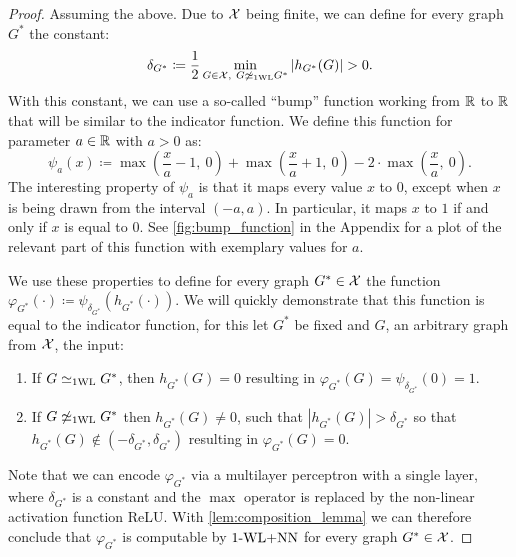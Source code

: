 \begin{proof}
    Assuming the above. Due to $\mathcal{X}$ being finite, we can define for every graph $G^*$ the constant:
    \begin{equation*}
        \delta_{G^*} \coloneqq \frac{1}{2} \min_{G \in \mathcal{X} , \  G \not\simeq_{\text{1WL}} G^*} |h_{G^*}(G)| > 0.
    \end{equation*}
    With this constant, we can use a so-called ``bump'' function working from $\mathbb{R}$ to $\mathbb{R}$ that will be similar to the indicator function. We define this function for parameter $a \in \mathbb{R}$ with $a > 0$ as:
    \begin{equation*}
        \psi_a(x) \coloneqq \max(\frac{x}{a} -1,\ 0) + \max(\frac{x}{a}+1, \ 0) - 2 \cdot \max(\frac{x}{a}, \ 0).
    \end{equation*}
    The interesting property of $\psi_a$ is that it maps every value $x$ to $0$, except when $x$ is being drawn from the interval $(-a, a)$. In particular, it maps $x$ to $1$ if and only if $x$ is equal to $0$. See \autoref{fig:bump_function} in the Appendix for a plot of the relevant part of this function with exemplary values for $a$.
    
    We use these properties to define for every graph ${G^*} \in \mathcal{X}$ the function $\varphi_{G^*}(\cdot) \coloneqq \psi_{\delta_{G^*}} (h_{G^*}(\cdot))$. 
    We will quickly demonstrate that this function is equal to the indicator function, for this let $G^*$ be fixed and $G$, an arbitrary graph from $\mathcal{X}$, the input:
    \begin{enumerate}
        \item If $G \simeq_{\text{1WL}} G^*$, then $h_{G^*}(G) = 0$ resulting in $\varphi_{G^*}(G) = \psi_{\delta_{G^*}}(0) = 1$.
        \item If $G \not\simeq_{\text{1WL}} G^*$ then $h_{G^*}(G) \neq 0$, such that $|h_{G^*}(G)|> \delta_{G^*}$ so that $h_{G^*}(G) \not\in (-\delta_{G^*}, \delta_{G^*}) $ resulting in $\varphi_{G^*}(G) = 0$.
    \end{enumerate}
    Note that we can encode $\varphi_{G^*}$ via a multilayer perceptron with a single layer, where $\delta_{G^*}$ is a constant and the $\max$ operator is replaced by the non-linear activation function ReLU. With \autoref{lem:composition_lemma} we can therefore conclude that $\varphi_{G^*}$ is computable by $\text{1-WL+NN}$ for every graph ${G^*} \in \mathcal{X}$.
\end{proof}

